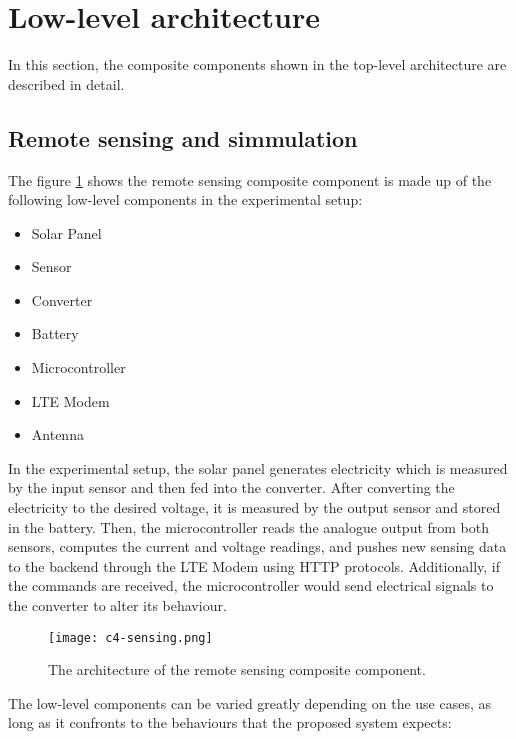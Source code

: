 \documentclass[../thesis.tex]{subfiles}
\begin{document}
\section{Low-level architecture}

In this section, the composite components shown in the top-level architecture are described in detail.

\subsection{Remote sensing and simmulation}
\label{sec:remoteSensing}
\label{sec:simulator}

The figure \ref{fig:sensing} shows the remote sensing composite component is made up of the following low-level components in the experimental setup:

\begin{itemize}
\item Solar Panel
\item Sensor
\item Converter
\item Battery
\item Microcontroller
\item LTE Modem
\item Antenna
\end{itemize}

In the experimental setup, the solar panel generates electricity which is measured by the input sensor and then fed into the converter. After converting the electricity to the desired voltage, it is measured by the output sensor and stored in the battery. Then, the microcontroller reads the analogue output from both sensors, computes the current and voltage readings, and pushes new sensing data to the backend through the LTE Modem using HTTP protocols. Additionally, if the commands are received, the microcontroller would send electrical signals to the converter to alter its behaviour.

\begin{figure}[!ht]
\centering
\texttt{[image: c4-sensing.png]}
\caption{The architecture of the remote sensing composite component.}
\label{fig:sensing}
\end{figure}


The low-level components can be varied greatly depending on the use cases, as long as it confronts to the behaviours that the proposed system expects:
\end{document}
